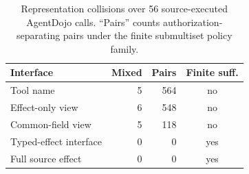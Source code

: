 \begin{table}[t]
\centering
\small
\setlength{\tabcolsep}{3.5pt}
\caption{Representation collisions over 56 source-executed AgentDojo calls.
``Pairs'' counts authorization-separating pairs under the finite submultiset
policy family.}
\label{tab:representation-collisions}
\begin{tabular}{lrrc}
\toprule
Interface & Mixed & Pairs & Finite suff. \\
\midrule
Tool name & 5 & 564 & no \\
Effect-only view & 6 & 548 & no \\
Common-field view & 5 & 118 & no \\
Typed-effect interface & 0 & 0 & yes \\
Full source effect & 0 & 0 & yes \\
\bottomrule
\end{tabular}
\end{table}
